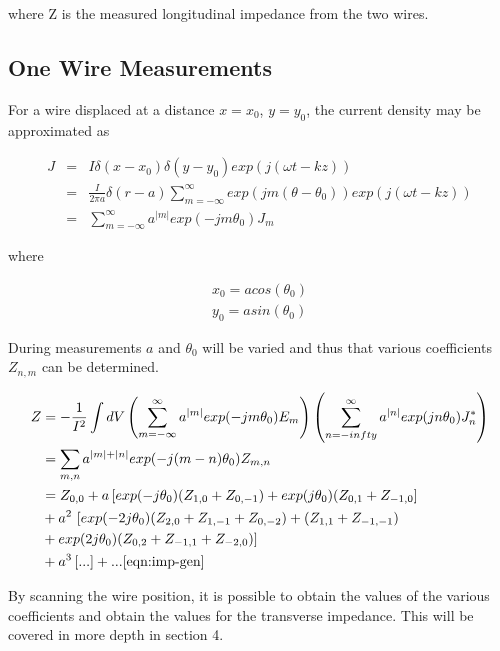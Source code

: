 where Z is the measured longitudinal impedance from the two wires.

\subsection{One Wire Measurements}

For a wire displaced at a distance $x=x_{0}$, $y=y_{0}$, the current density may be approximated as

\begin{align}
J & = & I\delta{}(x-x_{0})\delta{}(y-y_{0})exp(j(\omega t - kz)) \\
  & = & \frac{I}{2\pi a}\delta (r-a) \sum^{\infty}_{m=-\infty} exp(jm(\theta - \theta_{0})) exp(j(\omega t - kz)) \\
  & = & \sum^{\infty}_{m=-\infty} a^{|m|} exp(-jm\theta_{0})J_{m}
\end{align}

where

\begin{align*}
x_{0} = acos(\theta_{0}) \\
y_{0} = asin(\theta_{0})
\end{align*}

During measurements $a$ and $\theta_{0}$ will be varied and thus that various coefficients $Z_{n,m}$ can be determined.

\begin{align}
Z  &=  -\frac{1}{I^{2}}\int dV \left( \sum^{\infty}_{m=-\infty} a^{|m|} exp(-jm\theta_{0})E_{m} \right) \left( \sum^{\infty}_{n=-infty} a^{|n|} exp(jn\theta_{0}) J^{*}_{n} \right) \\
   &=  \sum_{m,n}a^{|m| + |n|}exp(-j(m-n)\theta_{0})Z_{m,n} \\
  &= Z_{0,0} + a \left[ exp(-j\theta_{0})(Z_{1,0} + Z_{0,-1}) + exp(j\theta_{0})(Z_{0,1}+Z_{-1,0} \right] \\
 & + a^{2} \ [ exp(-2j\theta_{0})(Z_{2,0} + Z_{1,-1} +Z_{0,-2}) + (Z_{1,1} + Z_{-1,-1}) \\
 & + exp(2j\theta_{0})(Z_{0,2} + Z_{-1,1} + Z_{-2,0}) ] \\
 & + a^{3} \left[...\right] + ...
\eqref{eqn:imp-gen}
\end{align}

By scanning the wire position, it is possible to obtain the values of the various coefficients and obtain the values for the transverse impedance. This will be covered in more depth in section 4.